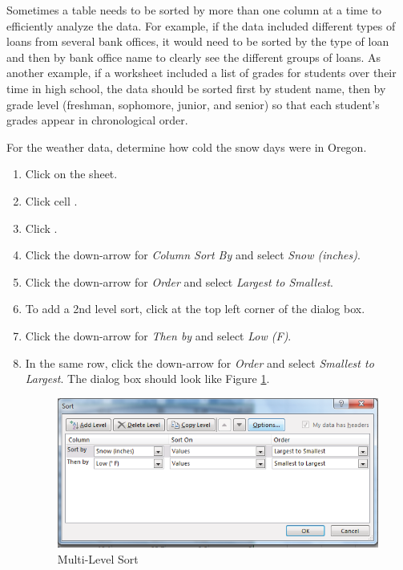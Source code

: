 Sometimes a table needs to be sorted by more than one column at a time to efficiently analyze the data. For example, if the data included different types of loans from several bank offices, it would need to be sorted by the type of loan and then by bank office name to clearly see the different groups of loans. As another example, if a worksheet included a list of grades for students over their time in high school, the data should be sorted first by student name, then by grade level (freshman, sophomore, junior, and senior) so that each student's grades appear in chronological order.

For the weather data, determine how cold the snow days were in Oregon.

\begin{enumbox}
	\begin{enumerate}
		\item Click on the  sheet.
		\item Click cell .
		\item Click .
		\item Click the down-arrow for \textit{Column Sort By} and select \textit{Snow (inches)}.
		\item Click the down-arrow for \textit{Order} and select \textit{Largest to Smallest}.
		\item To add a 2nd level sort, click  at the top left corner of the dialog box.
		\item Click the down-arrow for \textit{Then by} and select \textit{Low (\textdegree F)}.
		\item In the same row, click the down-arrow for \textit{Order} and select \textit{Smallest to Largest}. The dialog box should look like Figure \ref{05:fig11}.
	
		\begin{figure}[H]
			\centering
			\includegraphics[width=\maxwidth{.95\linewidth}]{gfx/ch05_fig11}
			\caption{Multi-Level Sort}
			\label{05:fig11}
		\end{figure}


\end{enumerate}
\end{enumbox}
